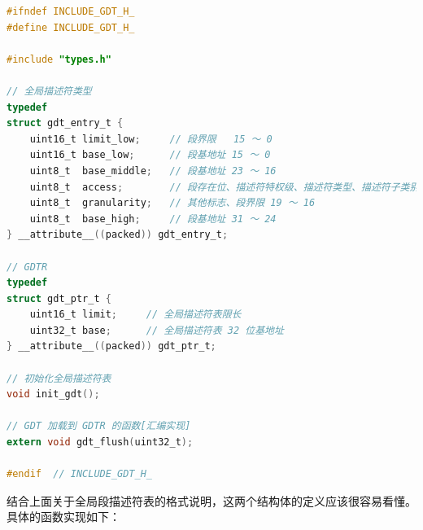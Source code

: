 \begin{lstlisting}[language = C, caption = include/gdt.h]
#ifndef INCLUDE_GDT_H_
#define INCLUDE_GDT_H_

#include "types.h"

// 全局描述符类型
typedef
struct gdt_entry_t {
	uint16_t limit_low;     // 段界限   15 ～ 0
	uint16_t base_low;      // 段基地址 15 ～ 0
	uint8_t  base_middle;   // 段基地址 23 ～ 16
	uint8_t  access;        // 段存在位、描述符特权级、描述符类型、描述符子类别
	uint8_t  granularity; 	// 其他标志、段界限 19 ～ 16
	uint8_t  base_high;     // 段基地址 31 ～ 24
} __attribute__((packed)) gdt_entry_t;

// GDTR
typedef
struct gdt_ptr_t {
	uint16_t limit; 	// 全局描述符表限长
	uint32_t base; 		// 全局描述符表 32 位基地址
} __attribute__((packed)) gdt_ptr_t;

// 初始化全局描述符表
void init_gdt();

// GDT 加载到 GDTR 的函数[汇编实现]
extern void gdt_flush(uint32_t);

#endif 	// INCLUDE_GDT_H_
\end{lstlisting}

\par 结合上面关于全局段描述符表的格式说明，这两个结构体的定义应该很容易看懂。具体的函数实现如下：

